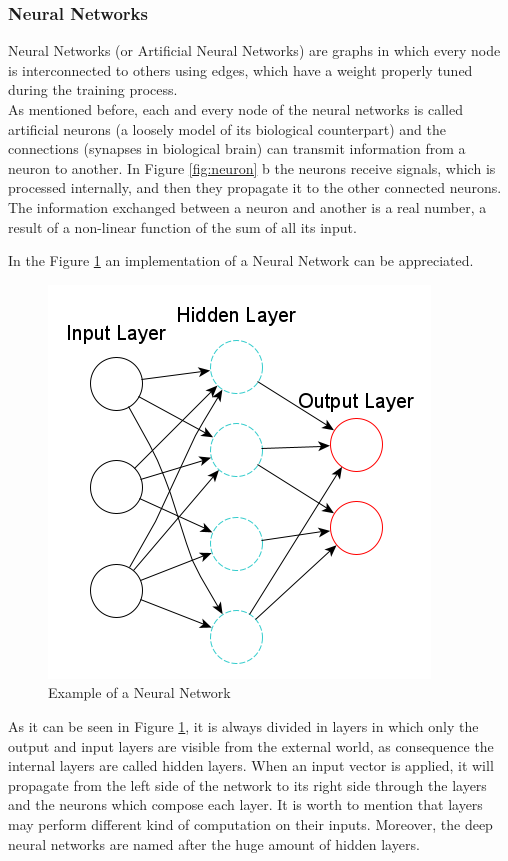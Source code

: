 \subsubsection{Neural Networks}

Neural Networks (or Artificial Neural Networks) are graphs in which every node is interconnected to others using edges, which have a weight properly tuned during the training process.\\
As mentioned before, each and every node of the neural networks is called artificial neurons (a loosely model of its biological counterpart) and the connections (synapses in biological brain) can transmit information from a neuron to another. In Figure \ref{fig:neuron} b the neurons receive signals, which is processed internally, and then they propagate it to the other connected neurons.\\
The information exchanged between a neuron and another is a real number, a result of a non-linear function of the sum of all its input.

In the Figure \ref{fig:nn} an implementation of a Neural Network can be appreciated.
\begin{figure}[H]
\centering
\captionsetup{justification=centering}
\includegraphics[scale=0.55]{./figure/neural_network.png}
\caption{Example of a Neural Network}
\label{fig:nn}
\end{figure}
As it can be seen in Figure \ref{fig:nn}, it is always divided in layers in which only the output and input layers are visible from the external world, as consequence the internal layers are called hidden layers. When an input vector is applied, it will propagate from the left side of the network to its right side through the layers and the neurons which compose each layer. It is worth to mention that layers may perform different kind of computation on their inputs. Moreover, the deep neural networks are named after the huge amount of hidden layers.\\\\

